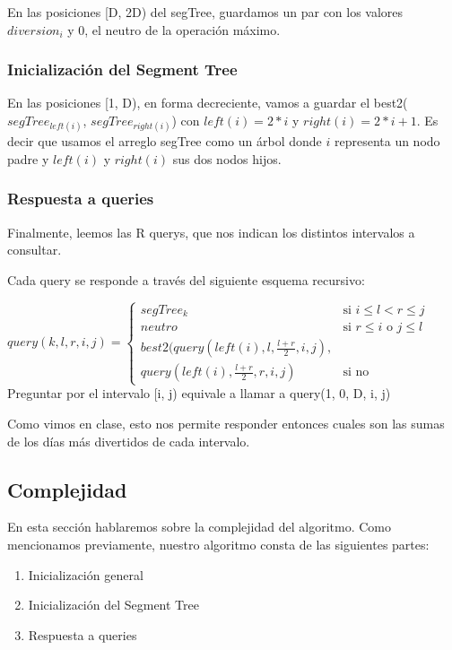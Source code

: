 En las posiciones [D, 2D) del segTree, guardamos un par con los valores \texttt{$diversion_i$} y 0, el neutro de la operaci\'on m\'aximo.

\subsubsection{Inicialización del Segment Tree}
En las posiciones [1, D), en forma decreciente, vamos a guardar el best2($segTree_{left(i)}$, $segTree_{right(i)}$) con $left(i) = 2 * i$ y $right(i) = 2 * i + 1$. Es decir que usamos el arreglo segTree como un \'arbol donde $i$ representa un nodo padre y $left(i)$ y $right(i)$ sus dos nodos hijos.

\subsubsection{Respuesta a queries}
Finalmente, leemos las R querys, que nos indican los distintos intervalos a consultar.

Cada query se responde a trav\'es del siguiente esquema recursivo:

$query(k, l, r, i, j) =
\left\{
	\begin{array}{ll}
		segTree_k  & \mbox{si } i \leq l < r \leq j \\
		neutro & \mbox{si } r \leq i \mbox{ o } j \leq l \\
		best2(query(left(i), l, \frac{l+r}{2}, i, j), \\ query(left(i), \frac{l+r}{2}, r, i, j) & \mbox{si no}
	\end{array}
\right. $ \\

Preguntar por el intervalo [i, j) equivale a llamar a query(1, 0, D, i, j)

{\color{red} Como vimos en clase, esto nos permite responder entonces cuales son las sumas de los días más divertidos de cada intervalo. }

\subsection{Complejidad}
En esta secci\'on hablaremos sobre la complejidad del algoritmo. Como mencionamos previamente, nuestro algoritmo consta de las siguientes partes:
\begin{enumerate}
\item Inicialización general
\item Inicialización del Segment Tree
\item Respuesta a queries
\end{enumerate}

